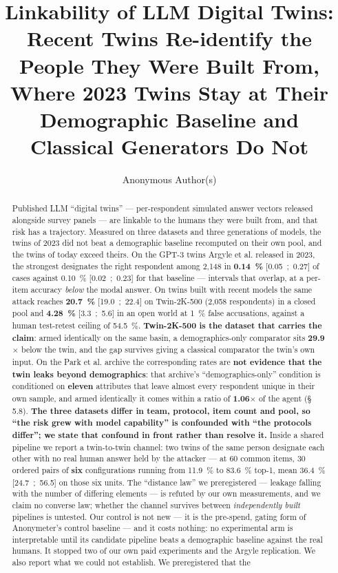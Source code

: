\documentclass[sigconf,anonymous,review]{acmart}
\begin{document}
\title[Linkability of LLM Digital Twins]{Linkability of LLM Digital Twins: Recent Twins Re-identify the People They Were Built From, Where 2023 Twins Stay at Their Demographic Baseline and Classical Generators Do Not}

\author{Anonymous Author(s)}
\renewcommand{\shortauthors}{Anonymous Author(s)}

\begin{abstract}
Published LLM ``digital twins'' --- per-respondent simulated answer vectors released alongside survey panels --- are linkable to the humans they were built from, and that risk has a trajectory. Measured on three datasets and three generations of models, the twins of 2023 did not beat a demographic baseline recomputed on their own pool, and the twins of today exceed theirs. On the GPT-3 twins Argyle et al. released in 2023, the strongest designates the right respondent among 2,148 in \textbf{0.14~\%} [0.05~;~0.27] of cases against 0.10~\% [0.02~;~0.23] for that baseline --- intervals that overlap, at a per-item accuracy \textit{below} the modal answer. On twins built with recent models the same attack reaches \textbf{20.7~\%} [19.0~;~22.4] on Twin-2K-500 (2,058 respondents) in a closed pool and \textbf{4.28~\%} [3.3~;~5.6] in an open world at 1~\% false accusations, against a human test-retest ceiling of 54.5~\%. \textbf{Twin-2K-500 is the dataset that carries the claim}: armed identically on the same basin, a demographics-only comparator sits \textbf{29.9$\times$} below the twin, and the gap survives giving a classical comparator the twin's own input. On the Park et al. archive the corresponding rates are \textbf{not evidence that the twin leaks beyond demographics}: that archive's ``demographics-only'' condition is conditioned on \textbf{eleven} attributes that leave almost every respondent unique in their own sample, and armed identically it comes within a ratio of \textbf{1.06$\times$} of the agent (\S\,5.8). \textbf{The three datasets differ in team, protocol, item count and pool, so ``the risk grew with model capability'' is confounded with ``the protocols differ''; we state that confound in front rather than resolve it.} Inside a shared pipeline we report a twin-to-twin channel: two twins of the same person designate each other with no real human answer held by the attacker --- at 60 common items, 30 ordered pairs of \textbf{six} configurations running from 11.9~\% to 83.6~\% top-1, mean 36.4~\% [24.7~;~56.5] on those six units. The ``distance law'' we preregistered --- leakage falling with the number of differing elements --- is refuted by our own measurements, and we claim no converse law; whether the channel survives between \textit{independently built} pipelines is untested. Our control is not new --- it is the pre-spend, gating form of Anonymeter's control baseline --- and it costs nothing: no experimental arm is interpretable until its candidate pipeline beats a demographic baseline against the real humans. It stopped two of our own paid experiments and the Argyle replication. We also report what we could not establish. We preregistered that the 
\end{abstract}
\end{document}
